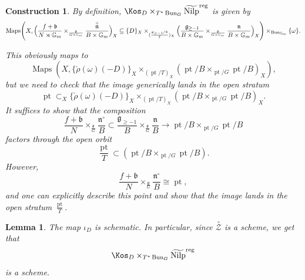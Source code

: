 \documentclass[9pt]{amsart}
\DeclareMathOperator{\pt}{{pt}}
\DeclareMathOperator{\reg}{{reg}}
\newcommand{\bG}{{\mathbb G}}
\newcommand{\cZ}{{\mathcal Z}}
\DeclareMathOperator{\Maps}{{Maps}}
\DeclareMathOperator{\Nilp}{{Nilp}} \DeclareMathOperator{\op}{{op}}
\newtheorem{lm}[subsubsection]{Lemma}
\newtheorem{cnstr}[subsubsection]{Construction}
\numberwithin{equation}{section}
\begin{document}
\begin{cnstr}
	By definition, $\Kos_D \times_{T^* \Bun_G} \widetilde{\Nilp}^{\reg}$ is given by 
	\begin{equation}
	\begin{split}
	\Maps\Biggl(X,  \Bigl(\frac{f+\mathfrak{b}}{N \rtimes \bG_m} \times_{\frac{\mathfrak{g}}{G \times \bG_m}} \frac{\stackrel{\circ}{\mathfrak{n}}}{B \times \bG_m}\Bigr)_X \subseteq \{D\}_X \times_{(\frac{\mathfrak{g}_{\geq -1}/\mathfrak{b}}{T})_X}\Bigl(\frac{\mathfrak{g}_{\geq -1}}{B \times \bG_m} \times_{\frac{\mathfrak{g}}{G \times \bG_m}} \frac{\mathfrak{n}}{B\times \bG_m}\Bigr)_X \Biggr)\times_{\Bun_{\bG_m}}  \{ \omega\}.
	\end{split}
	\end{equation}
	
	
	This obviously maps to $$\Maps(X, \{ \check{\rho}(\omega)(-D)\}_X\times_{(\pt/T)_X} (\pt/B \times_{\pt/G} \pt/B)_X  ),$$
	but we need to check that the image generically lands in the open stratum $$\pt \subset_X \{ \check{\rho}(\omega)(-D)\}_X\times_{(\pt/T)_X} (\pt/B \times_{\pt/G} \pt/B)_X .$$ 
	It suffices to show that the composition
	$$\frac{f+\mathfrak{b}}{N } \times_{\frac{\mathfrak{g}}{G}} \frac{\mathfrak{\mathfrak{n}^\circ}}{B} \subset  \frac{\mathfrak{g}_{\geq -1}}{B } \times_{\frac{\mathfrak{g}}{G}} \frac{\mathfrak{n}}{B} \rightarrow \pt/B \times_{\pt/ G} \pt/B$$
	factors through the open orbit $$\frac{\pt}{T}\subset (\pt/B \times_{\pt/G} \pt/B).$$ However, 
	$$\frac{f+\mathfrak{b}}{N } \times_{\frac{\mathfrak{g}}{G}} \frac{\mathfrak{\mathfrak{n}^\circ}}{B} \cong \pt,$$
	and one can explicitly describe this point and show that the image lands in the open stratum $\frac{\pt}{T}$.
\end{cnstr}

\begin{lm}\label{intersection smooth}
	The map $\iota_{D}$ is schematic. In particular, since $\stackrel{\circ}{\cZ}$ is a scheme, we get that $$\Kos_D \times_{T^* \Bun_G} \widetilde{\Nilp}^{\reg}$$ is a scheme.
\end{lm}
\end{document}
